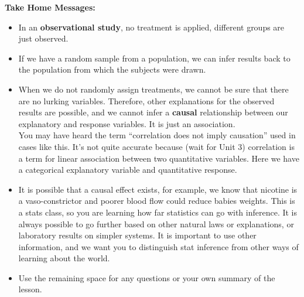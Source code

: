 \begin{center}
  {\bf Take Home Messages:}
    \vspace{-.4cm}   
\end{center}
\begin{itemize}
  \item In an {\bf observational study}, no treatment is applied,
    different groups are just observed.
  \item If we have a random sample from a population, we can infer
    results back to the population from which the subjects were drawn.
  \item When we do not randomly  assign treatments, we cannot be sure
    that there are no lurking variables. Therefore, other explanations
    for the observed results are possible, and we cannot infer a {\bf
      causal} relationship between our explanatory and response
    variables. It is just an association. \\
    You may have heard the term ``correlation does not imply
    causation'' used in cases like this. It's not quite accurate
    because (wait for Unit 3) correlation is a term for linear
    association between two quantitative variables.  Here we have a
    categorical explanatory variable and quantitative response.
  \item 
    It is possible that a causal effect exists, for example, we know
    that nicotine is a vaso-constrictor and poorer blood flow could
    reduce babies weights.  This is a stats class, so you are learning
    how far statistics can go with inference.  It is always possible
    to go further based on other natural laws or explanations, or
    laboratory results on simpler systems.  It is important to use
    other information, and we want you to distinguish stat inference
    from other ways of learning about the world.
 \item 
  Use the remaining space for any questions or your own summary of the
  lesson. 

\end{itemize}




